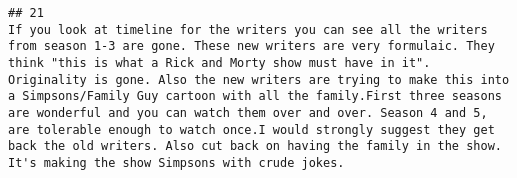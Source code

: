 \documentclass[
]{article}
\begin{document}
\begin{verbatim}
## 21                                                                                                                                                                                                                                                                                                                                                                                                                                                                                                                                                                                                                                                                                                                                                                                                                                                                                                                                                                                                                                                                                                                                                                                                                                                                                                                                                                                                                                                                                                                                                                                                                                                                                                                                                                                                                                    If you look at timeline for the writers you can see all the writers from season 1-3 are gone. These new writers are very formulaic. They think "this is what a Rick and Morty show must have in it". Originality is gone. Also the new writers are trying to make this into a Simpsons/Family Guy cartoon with all the family.First three seasons are wonderful and you can watch them over and over. Season 4 and 5, are tolerable enough to watch once.I would strongly suggest they get back the old writers. Also cut back on having the family in the show. It's making the show Simpsons with crude jokes.

\end{verbatim}
\end{document}
